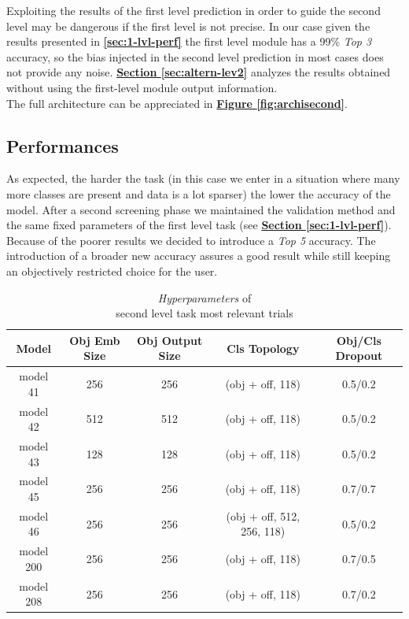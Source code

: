\documentclass[12pt]{article}
\begin{document}
Exploiting the results of the first level prediction in order to guide the second level may be dangerous if the first level is not precise. In our case given the results presented in \textbf{\ref{sec:1-lvl-perf}} the first level module has a 99\% \textit{Top 3} accuracy, so the bias injected in the second level prediction in most cases does not provide any noise. \hyperref[sec:altern-lev2]{\textbf{Section \ref{sec:altern-lev2}}} analyzes the results obtained without using the first-level module output information.
\\The full architecture can be appreciated in \hyperref[fig:archisecond]{\textbf{Figure \ref{fig:archisecond}}}.

\subsection{Performances}\label{sec:secondlevelperformances}
As expected, the harder the task (in this case we enter in a situation where many more classes are present and data is a lot sparser) the lower the accuracy of the model. After a second screening phase we maintained the validation method and the same fixed parameters of the first level task (see \hyperref[sec:1-lvl-perf]{\textbf{Section \ref{sec:1-lvl-perf}}}). Because of the poorer results we decided to introduce a \textit{Top 5} accuracy. The introduction of a broader new accuracy assures a good result while still keeping an objectively restricted choice for the user. 

\begin{table}[h!]
	    \centering
	    \scriptsize
	    \begin{tabular}{ |c|c|c|c|c| }
        \hline
        \textbf{Model} & \textbf{Obj Emb Size} & \textbf{Obj Output Size} & \textbf{Cls Topology} & \textbf{Obj/Cls Dropout}\\
        \hline
        model 41 & 256 & 256 & (obj + off, 118) & 0.5/0.2\\
        model 42 & 512 & 512 & (obj + off, 118) & 0.5/0.2\\
        model 43 & 128 & 128 & (obj + off, 118) & 0.5/0.2\\
        model 45 & 256 & 256 & (obj + off, 118) & 0.7/0.7\\
        model 46 & 256 & 256 & (obj + off, 512, 256, 118) & 0.5/0.2\\
        model 200 & 256 & 256 & (obj + off, 118) & 0.7/0.5\\
        model 208 & 256 & 256 & (obj + off, 118) & 0.7/0.2\\
        \hline
        \end{tabular}
        \captionsetup{justification   = centering}
	    \caption{\textit{Hyperparameters} of \\second level task most relevant trials}
        \label{tb:secondlevel}
\end{table}
\end{document}
